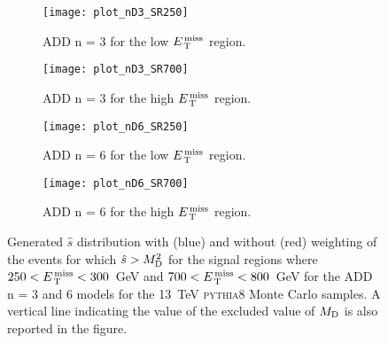 \begin{figure}[!h]
  \centering
  \begin{subfigure}{.48\linewidth}
    \texttt{[image: plot\_nD3\_SR250]}
    \caption{ADD n = 3 for the low $E_\mathrm{\, T}^\mathrm{\, miss}$ region.}
    \label{fig:shat_n3_250}
  \end{subfigure}
  \begin{subfigure}{.48\linewidth}
    \texttt{[image: plot\_nD3\_SR700]}
    \caption{ADD n = 3 for the high $E_\mathrm{\, T}^\mathrm{\, miss}$ region.}
    \label{fig:shat_n3_700}
  \end{subfigure}
  \begin{subfigure}{.48\linewidth}
    \texttt{[image: plot\_nD6\_SR250]}
    \caption{ADD n = 6 for the low $E_\mathrm{\, T}^\mathrm{\, miss}$ region.}
    \label{fig:shat_n6_250}
  \end{subfigure}
  \begin{subfigure}{.48\linewidth}
    \texttt{[image: plot\_nD6\_SR700]}
    \caption{ADD n = 6 for the high $E_\mathrm{\, T}^\mathrm{\, miss}$ region.}
    \label{fig:shat_n6_700}
  \end{subfigure}
  \caption{Generated $\hat{s}$ distribution with (blue) and without (red)
    weighting of the events for which $\hat{s} > M_\mathrm{D}^2$ for the signal regions
    where $250 < E_\mathrm{\, T}^\mathrm{\, miss} < 300$~GeV and $700 < E_\mathrm{\, T}^\mathrm{\, miss} < 800$~GeV for the ADD n = 3
    and 6 models for the 13~TeV \textsc{pythia8} Monte Carlo samples. A vertical
    line indicating the value of the excluded value of $M_\mathrm{D}$ is also reported in
    the figure.}
  \label{fig:shat}
\end{figure}

